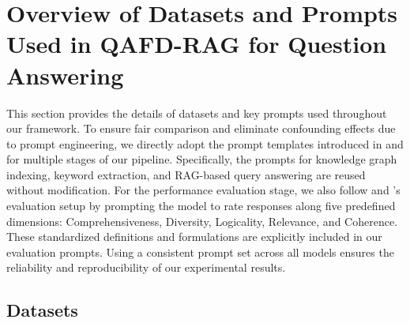 \documentclass{article} %
\begin{document}
\section{Overview of Datasets and Prompts Used in QAFD-RAG for Question Answering}\label{app:prompts:qa}







This section provides the details of datasets and  key prompts used throughout our framework. To ensure fair comparison and eliminate confounding effects due to prompt engineering, we directly adopt the prompt templates introduced in \cite{chen2025pathrag} and \cite{guo2024lightrag} for multiple stages of our pipeline. Specifically, the prompts for knowledge graph indexing, keyword extraction, and RAG-based query answering are reused without modification. For the performance evaluation stage, we also follow \cite{chen2025pathrag} and \cite{guo2024lightrag}’s evaluation setup by prompting the model to rate responses along five predefined dimensions: Comprehensiveness, Diversity, Logicality, Relevance, and Coherence. These standardized definitions and formulations are explicitly included in our evaluation prompts. Using a consistent prompt set across all models ensures the reliability and reproducibility of our experimental results.



\subsection{Datasets}
\label{app:datasets}

\begin{table}[htbp]
\centering
\caption{Dataset statistics for the UltraDomain subsets used in our evaluation.}
\label{tab:dataset_description}
\end{table}
\end{document}
